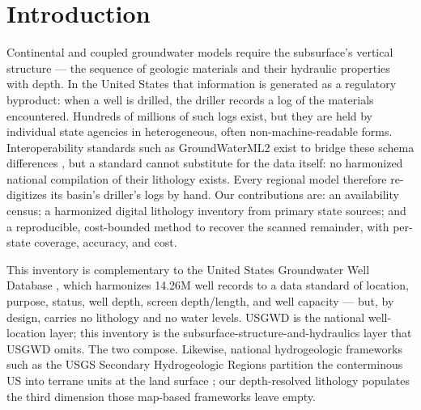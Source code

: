 \documentclass[12pt]{article}
\begin{document}
\section{Introduction}
Continental and coupled groundwater models require the subsurface's vertical structure --- the sequence of
geologic materials and their hydraulic properties with depth. In the United States that information is
generated as a regulatory byproduct: when a well is drilled, the driller records a log of the
materials encountered. Hundreds of millions of such logs exist, but they are held by individual state
agencies in heterogeneous, often non-machine-readable forms. Interoperability standards such as
GroundWaterML2 exist to bridge these schema differences \citep{brodaric2018gwml2}, but a standard cannot
substitute for the data itself: no harmonized national compilation of their lithology exists. Every regional model therefore re-digitizes its basin's driller's logs by
hand. Our contributions are: an availability census; a harmonized digital lithology inventory from
primary state sources; and a reproducible, cost-bounded method to recover the scanned remainder, with
per-state coverage, accuracy, and cost.

This inventory is complementary to the United States Groundwater Well Database
\citep[USGWD;][]{lin2024usgwd}, which harmonizes 14.26M well records to a data standard of location,
purpose, status, well depth, screen depth/length, and well capacity --- but, by design, carries
no lithology and no water levels. USGWD is the national well-location layer; this
inventory is the subsurface-structure-and-hydraulics layer that USGWD omits. The two compose. Likewise,
national hydrogeologic frameworks such as the USGS Secondary Hydrogeologic Regions partition the
conterminous US into terrane units at the land surface \citep{belitz2019regions}; our depth-resolved
lithology populates the third dimension those map-based frameworks leave empty.
\end{document}
